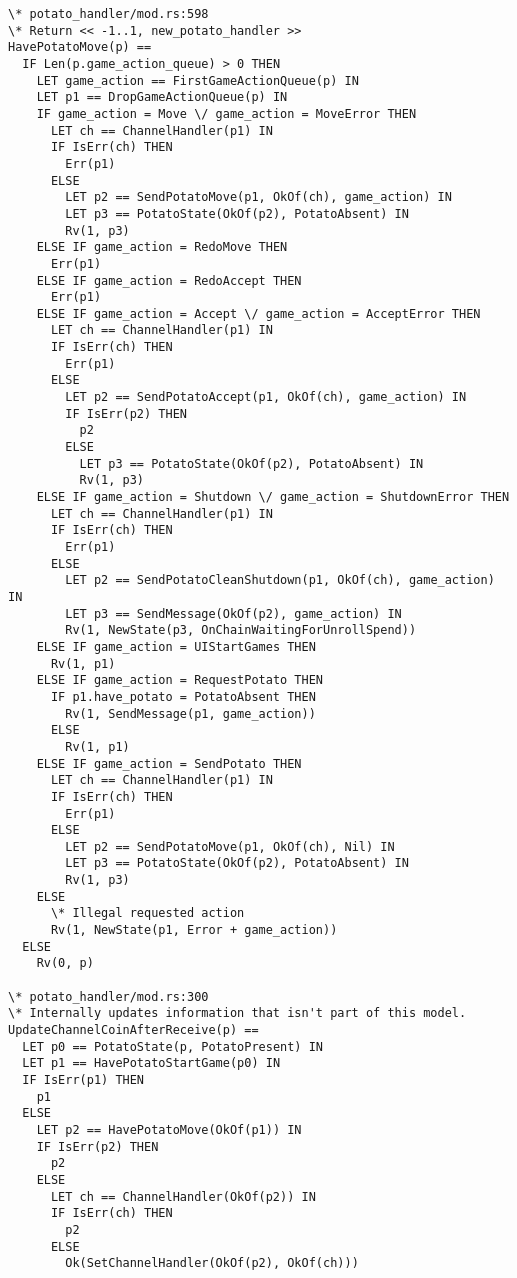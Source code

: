 \documentclass[a4paper]{article}
\begin{document}
\begin{multicols}{2}
\begin{verbatim}
\* potato_handler/mod.rs:598
\* Return << -1..1, new_potato_handler >>
HavePotatoMove(p) ==
  IF Len(p.game_action_queue) > 0 THEN
    LET game_action == FirstGameActionQueue(p) IN
    LET p1 == DropGameActionQueue(p) IN
    IF game_action = Move \/ game_action = MoveError THEN
      LET ch == ChannelHandler(p1) IN
      IF IsErr(ch) THEN
        Err(p1)
      ELSE
        LET p2 == SendPotatoMove(p1, OkOf(ch), game_action) IN
        LET p3 == PotatoState(OkOf(p2), PotatoAbsent) IN
        Rv(1, p3)
    ELSE IF game_action = RedoMove THEN
      Err(p1)
    ELSE IF game_action = RedoAccept THEN
      Err(p1)
    ELSE IF game_action = Accept \/ game_action = AcceptError THEN
      LET ch == ChannelHandler(p1) IN
      IF IsErr(ch) THEN
        Err(p1)
      ELSE
        LET p2 == SendPotatoAccept(p1, OkOf(ch), game_action) IN
        IF IsErr(p2) THEN
          p2
        ELSE
          LET p3 == PotatoState(OkOf(p2), PotatoAbsent) IN
          Rv(1, p3)
    ELSE IF game_action = Shutdown \/ game_action = ShutdownError THEN
      LET ch == ChannelHandler(p1) IN
      IF IsErr(ch) THEN
        Err(p1)
      ELSE
        LET p2 == SendPotatoCleanShutdown(p1, OkOf(ch), game_action) IN
        LET p3 == SendMessage(OkOf(p2), game_action) IN
        Rv(1, NewState(p3, OnChainWaitingForUnrollSpend))
    ELSE IF game_action = UIStartGames THEN
      Rv(1, p1)
    ELSE IF game_action = RequestPotato THEN
      IF p1.have_potato = PotatoAbsent THEN
        Rv(1, SendMessage(p1, game_action))
      ELSE
        Rv(1, p1)
    ELSE IF game_action = SendPotato THEN
      LET ch == ChannelHandler(p1) IN
      IF IsErr(ch) THEN
        Err(p1)
      ELSE
        LET p2 == SendPotatoMove(p1, OkOf(ch), Nil) IN
        LET p3 == PotatoState(OkOf(p2), PotatoAbsent) IN
        Rv(1, p3)
    ELSE
      \* Illegal requested action
      Rv(1, NewState(p1, Error + game_action))
  ELSE
    Rv(0, p)

\* potato_handler/mod.rs:300
\* Internally updates information that isn't part of this model.
UpdateChannelCoinAfterReceive(p) ==
  LET p0 == PotatoState(p, PotatoPresent) IN
  LET p1 == HavePotatoStartGame(p0) IN
  IF IsErr(p1) THEN
    p1
  ELSE
    LET p2 == HavePotatoMove(OkOf(p1)) IN
    IF IsErr(p2) THEN
      p2
    ELSE
      LET ch == ChannelHandler(OkOf(p2)) IN
      IF IsErr(ch) THEN
        p2
      ELSE
        Ok(SetChannelHandler(OkOf(p2), OkOf(ch)))


\end{verbatim}
\end{multicols}
\end{document}
